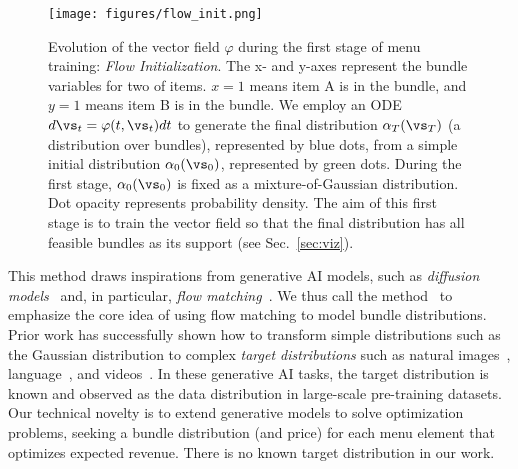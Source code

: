 \begin{figure}
    \centering
    \texttt{[image: figures/flow\_init.png]}
    \caption{Evolution of the vector field $\varphi$ during the first stage of menu training: \emph{Flow Initialization}. The x- and y-axes represent the bundle variables for two of items. $x=1$ means item A is in the bundle, and $y=1$ means item B is in the bundle. We employ an ODE $d\vs_t = \varphi(t, \vs_t) dt$ to generate the final distribution $\alpha_T(\vs_T)$ (a distribution over bundles), represented by blue dots, from a simple initial distribution $\alpha_0(\vs_0)$, represented by green dots. During the first stage, $\alpha_0(\vs_0)$ is fixed as a mixture-of-Gaussian distribution. Dot opacity represents probability density. The aim of this first stage is to train the vector field so that the final distribution has all feasible bundles as its support (see Sec.~\ref{sec:viz}).
    \label{fig:flow_init}}
\end{figure}
This method draws inspirations from generative AI models, such as {\em diffusion models}~\cite{ho2020denoising, kadkhodaie2023generalization,song2021score,song2019generative} and, in particular, {\em flow matching}~\cite{chen2018neural,liu2022flow,lipman2022flow}.  We thus call the  method \name~to emphasize the core idea of using flow matching to model bundle distributions. Prior work has successfully shown how to transform simple distributions such as the Gaussian distribution to complex \emph{target distributions} such as natural images~\cite{rombach2022high,esser2024scaling}, language~\cite{lou2024discrete}, and videos~\cite{stabilityAI2023}. In these generative AI tasks, the target distribution is known and observed as the data distribution in large-scale pre-training datasets. Our technical novelty is to extend generative models to solve optimization problems, seeking a bundle distribution (and price) for
each menu element that optimizes expected revenue. 
There is no known target distribution in our work.



